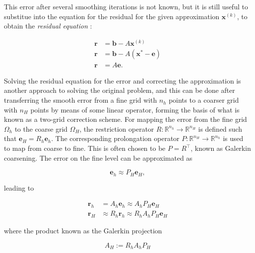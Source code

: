 This error after several smoothing iterations is not known, but it is still useful to substitue into the equation for the residual for the given approximation $\mathbf{x}^{(k)}$, to obtain the \emph{residual equation} \cite{Briggs2000}:

\begin{equation}
	\begin{aligned}
	\mathbf{r} &= \mathbf{b} - A\mathbf{x}^{(k)} \\
	\mathbf{r} &= \mathbf{b} - A\left( \mathbf{x}^* - \mathbf{e} \right) \\
	\mathbf{r} &= A\mathbf{e}.
	\end{aligned}
\end{equation}


Solving the residual equation for the error and correcting the approximation is another approach to solving the original problem, and this can be done after transferring the smooth error from a fine grid with $n_h$ points to a coarser grid with $n_H$ points by means of some linear operator, forming the basis of what is known as a two-grid correction scheme. For mapping the error from the fine grid $\Omega_h$ to the coarse grid $\Omega_H$, the restriction operator $R : \mathbb{R}^{n_h} \rightarrow \mathbb{R}^{n_H}$ is defined such that $\mathbf{e}_H = R_h \mathbf{e}_h$. The corresponding prolongation operator $P : \mathbb{R}^{n_H} \rightarrow \mathbb{R}^{n_h}$ is used to map from coarse to fine. This is often chosen to be $P = R^\top$, known as Galerkin coarsening. The error on the fine level can be approximated as

\begin{equation}
	\mathbf{e}_h \approx P_H \mathbf{e}_H,
\end{equation}

leading to

\begin{equation}
	\begin{aligned}
	\mathbf{r}_h & = A_h \mathbf{e}_h \approx A_h P_H \mathbf{e}_H \\
	\mathbf{r}_H & \approx R_h \mathbf{r}_h \approx R_h A_h P_H \mathbf{e}_H
	\end{aligned}
\end{equation}

where the product known as the Galerkin projection

\begin{equation}
	\label{eq:Galerkin}
	A_H := R_h A_h P_H
\end{equation}

